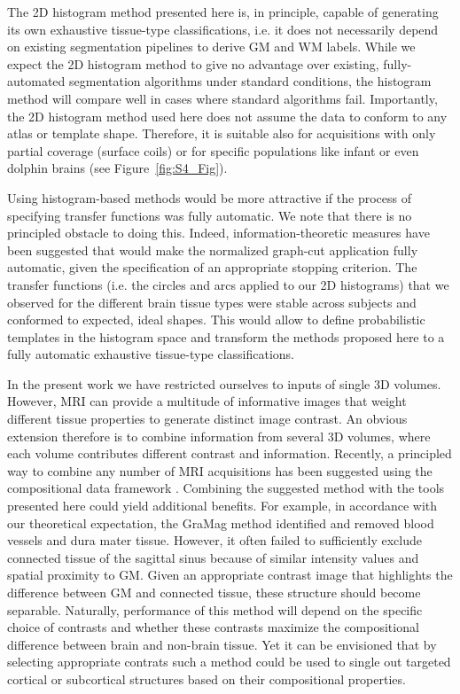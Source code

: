 The 2D histogram method presented here is, in principle, capable of generating its own exhaustive tissue-type classifications, i.e. it does not necessarily depend on existing segmentation pipelines to derive GM and WM labels. While we expect the 2D histogram method to give no advantage over existing, fully-automated segmentation algorithms under standard conditions, the histogram method will compare well in cases where standard algorithms fail. Importantly, the 2D histogram method used here does not assume the data to conform to any atlas or template shape. Therefore, it is suitable also for acquisitions with only partial coverage (surface coils) or for specific populations like infant or even dolphin brains (see Figure~\ref{fig:S4_Fig}).

Using histogram-based methods would be more attractive if the process of specifying transfer functions was fully automatic. We note that there is no principled obstacle to doing this. Indeed, information-theoretic measures have been suggested \parencite{Ip2012} that would make the normalized graph-cut application fully automatic, given the specification of an appropriate stopping criterion. The transfer functions (i.e. the circles and arcs applied to our 2D histograms) that we observed for the different brain tissue types were stable across subjects and conformed to expected, ideal shapes. This would allow to define probabilistic templates in the histogram space and transform the methods proposed here to a fully automatic exhaustive tissue-type classifications.

In the present work we have restricted ourselves to inputs of single 3D volumes. However, MRI can provide a multitude of informative images that weight different tissue properties to generate distinct image contrast. An obvious extension therefore is to combine information from several 3D volumes, where each volume contributes different contrast and information. Recently, a principled way to combine any number of MRI acquisitions has been suggested using the compositional data framework \parencite{Gulban2018c}. Combining the suggested method with the tools presented here could yield additional benefits. For example, in accordance with our theoretical expectation, the GraMag method identified and removed blood vessels and dura mater tissue. However, it often failed to sufficiently exclude connected tissue of the sagittal sinus because of similar intensity values and spatial proximity to GM. 
Given an appropriate contrast image that highlights the difference between GM and connected tissue, these structure should become separable. Naturally, performance of this method will depend on the specific choice of contrasts and whether these contrasts maximize the compositional difference between brain and non-brain tissue. Yet it can be envisioned that by selecting appropriate contrats such a method could be used to single out targeted cortical or subcortical structures based on their compositional properties.

